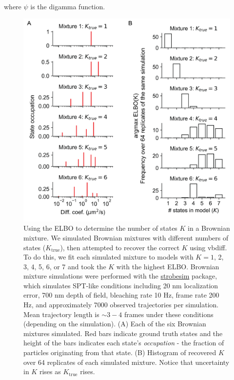 \documentclass{article}
\begin{document}
where $\psi$ is the digamma function.

\begin{figure}
\includegraphics[width=0.55\pagewidth]{elbo_comparison.png}
\caption{Using the ELBO to determine the number of states $K$ in a Brownian mixture. We simulated Brownian mixtures with different numbers of states ($K_{\text{true}}$), then attempted to recover the correct $K$ using vbdiff. To do this, we fit each simulated mixture to models with $K=1$, 2, 3, 4, 5, 6, or 7 and took the $K$ with the highest ELBO. Brownian mixture simulations were performed with the \href{https://github.com/alecheckert/strobesim}{strobesim} package, which simulates SPT-like conditions including 20 nm localization error, 700 nm depth of field, bleaching rate 10 Hz, frame rate 200 Hz, and approximately 7000 observed trajectories per simulation. Mean trajectory length is $\sim 3-4$ frames under these conditions (depending on the simulation). (A) Each of the six Brownian mixtures simulated. Red bars indicate ground truth states and the height of the bars indicates each state's \emph{occupation} - the fraction of particles originating from that state. (B) Histogram of recovered $K$ over 64 replicates of each simulated mixture. Notice that uncertainty in $K$ rises as $K_{\text{true}}$ rises.}
\end{figure}
\end{document}
